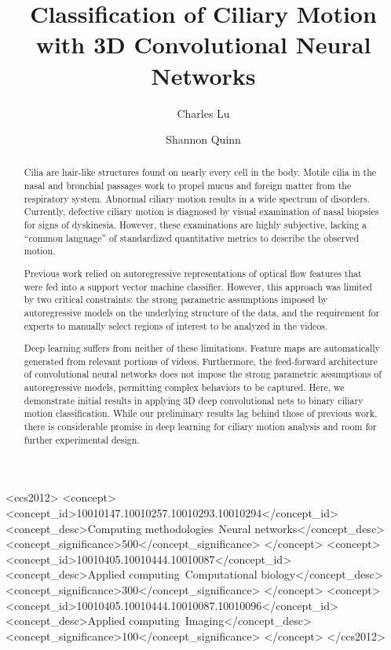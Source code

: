 \documentclass[sigconf]{acmart}
\begin{document}
\title{Classification of Ciliary Motion with 3D Convolutional Neural Networks}
\subtitle{}

\author{Charles Lu}


\author{Shannon Quinn}


\begin{abstract}
Cilia are hair-like structures found on nearly every cell in the body. Motile cilia in the nasal and bronchial passages work to propel mucus and foreign matter from the respiratory system. Abnormal ciliary motion results in a wide spectrum of disorders. Currently, defective ciliary motion is diagnosed by visual examination of nasal biopsies for signs of dyskinesia. However, these examinations are highly subjective, lacking a ``common language'' of standardized quantitative metrics to describe the observed motion.

Previous work relied on autoregressive representations of optical flow features that were fed into a support vector machine classifier. However, this approach was limited by two critical constraints: the strong parametric assumptions imposed by autoregressive models on the underlying structure of the data, and the requirement for experts to manually select regions of interest to be analyzed in the videos.

Deep learning suffers from neither of these limitations. Feature maps are automatically generated from relevant portions of videos. Furthermore, the feed-forward architecture of convolutional neural networks does not impose the strong parametric assumptions of autoregressive models, permitting complex behaviors to be captured. Here, we demonstrate initial results in applying 3D deep convolutional nets to binary ciliary motion classification. While our preliminary results lag behind those of previous work, there is considerable promise in deep learning for ciliary motion analysis and room for further experimental design.

\end{abstract}

%
%
\begin{CCSXML}
<ccs2012>
<concept>
<concept_id>10010147.10010257.10010293.10010294</concept_id>
<concept_desc>Computing methodologies~Neural networks</concept_desc>
<concept_significance>500</concept_significance>
</concept>
<concept>
<concept_id>10010405.10010444.10010087</concept_id>
<concept_desc>Applied computing~Computational biology</concept_desc>
<concept_significance>300</concept_significance>
</concept>
<concept>
<concept_id>10010405.10010444.10010087.10010096</concept_id>
<concept_desc>Applied computing~Imaging</concept_desc>
<concept_significance>100</concept_significance>
</concept>
</ccs2012>
\end{CCSXML}
\end{document}
